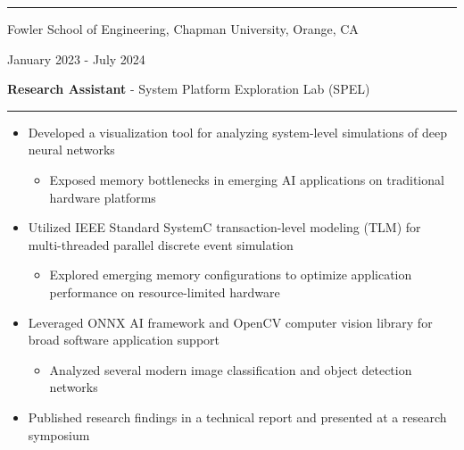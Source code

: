 \documentclass[letter]{article}
\begin{document}
    \vspace{4pt}
    \hrule height 1pt
    \vspace{4pt}
    \noindent
    \begin{minipage}[c]{0.65\linewidth}
        \noindent Fowler School of Engineering, Chapman University, Orange, CA
    \end{minipage}
    \begin{minipage}[c]{0.341\linewidth}
        \begin{flushright}
            January 2023 - July 2024
        \end{flushright}
    \end{minipage}
    \begin{minipage}[c]{0.65\linewidth}
        \noindent \textbf{Research Assistant} - System Platform Exploration Lab (SPEL)
    \end{minipage}
    \noindent
    \vspace{4pt}
    \hrule
    \vspace{4pt}
    \noindent
    \begin{itemize}[noitemsep, topsep=0pt]
        \item Developed a visualization tool for analyzing system-level simulations of deep neural networks
            \begin{itemize}[noitemsep, topsep=0pt]
            \item Exposed memory bottlenecks in emerging AI applications on traditional hardware platforms
            \end{itemize}
        \item Utilized IEEE Standard SystemC transaction-level modeling (TLM) for multi-threaded parallel discrete event simulation
            \begin{itemize}[noitemsep, topsep=0pt]
            \item Explored emerging memory configurations to optimize application performance on resource-limited hardware
            \end{itemize}
        \item Leveraged ONNX AI framework and OpenCV computer vision library for broad software application support
            \begin{itemize}[noitemsep, topsep=0pt]
            \item Analyzed several modern image classification and object detection networks
            \end{itemize}
        \item Published research findings in a technical report and presented at a research symposium
    \end{itemize}
    \medskip
\end{document}
